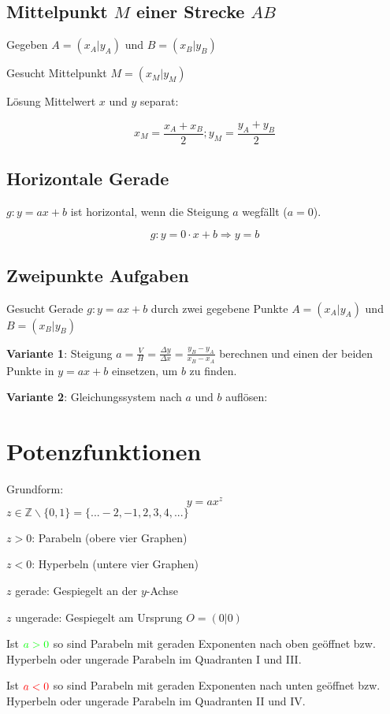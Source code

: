 \begin{multicols}{2}
\subsection{Mittelpunkt $M$ einer Strecke $AB$}
Gegeben $A=(x_A|y_A)$ und $B=(x_B|y_B)$

Gesucht Mittelpunkt $M=(x_M|y_M)$

Lösung Mittelwert $x$ und $y$ separat:

$$x_M = \frac{x_A+x_B}2; y_M=\frac{y_A+y_B}2$$

\subsection{Horizontale Gerade}

$g: y=ax+b$ ist horizontal, wenn die Steigung $a$ wegfällt ($a=0$).

$$g:  y=0\cdot{}x+b \Rightarrow y=b$$

\subsection{Zweipunkte Aufgaben}
Gesucht Gerade $g: y=ax+b$ durch zwei gegebene Punkte $A=(x_A|y_A)$
und $B=(x_B|y_B)$

\textbf{Variante 1}: Steigung $a = \frac{V}H = \frac{\Delta y}{\Delta x}
= \frac{y_B-y_A}{x_B-x_A}$ berechnen und einen der beiden Punkte in
$y=ax+b$ einsetzen, um $b$ zu finden.

\textbf{Variante 2}: Gleichungssystem nach $a$ und $b$ auf\/lösen:

\hrulefill

\section{Potenzfunktionen}
Grundform:
$$y=ax^z$$
$z\in\mathbb{Z}\backslash\{0,1\} = \{...-2, -1, 2, 3, 4, ...\}$

$z>0$: Parabeln (obere vier Graphen)

$z<0$: Hyperbeln (untere vier Graphen)

$z$ gerade: Gespiegelt an der $y$-Achse

$z$ ungerade: Gespiegelt am Ursprung $O=(0|0)$

Ist ${\color{green}a>0}$ so sind Parabeln mit geraden Exponenten nach oben geöffnet bzw. Hyperbeln oder ungerade
Parabeln im Quadranten I und III.

Ist ${\color{red}a<0}$ so sind Parabeln mit geraden Exponenten nach unten geöffnet bzw. Hyperbeln oder ungerade
Parabeln im Quadranten II und IV.


\end{multicols}
